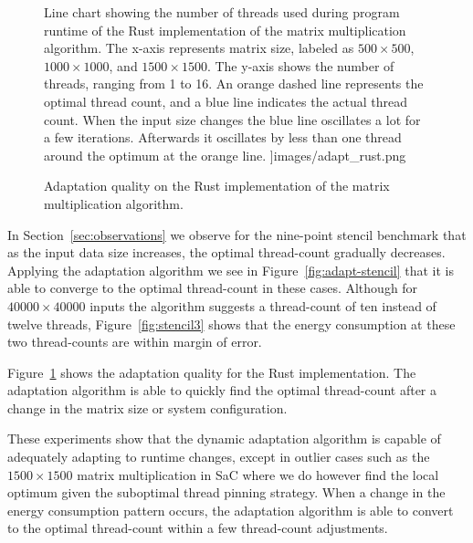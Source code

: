 \begin{figure}[t]
\begin{minipage}[c]{0.49\linewidth}
{            Line chart showing the number of threads used during program runtime of the Rust
            implementation of the matrix multiplication algorithm. The x-axis represents matrix
            size, labeled as $500 \times 500$, $1000 \times 1000$, and $1500 \times 1500$. The
            y-axis shows the number of threads, ranging from 1 to 16. An orange dashed line
            represents the optimal thread count, and a blue line indicates the actual thread count.
            When the input size changes the blue line oscillates a lot for a few iterations.
            Afterwards it oscillates by less than one thread around the optimum at the orange line.
        }]{images/adapt_rust.png}
        \caption{Adaptation quality on the Rust implementation of the matrix multiplication algorithm.}
        \label{fig:adapt-rust}
    \end{minipage}%
\end{figure}

In Section~\ref{sec:observations} we observe for the nine-point stencil benchmark that as the input
data size increases, the optimal thread-count gradually decreases. Applying the adaptation algorithm
we see in Figure~\ref{fig:adapt-stencil} that it is able to converge to the optimal thread-count in
these cases. Although for $40000 \times 40000$ inputs the algorithm suggests a thread-count of ten
instead of twelve threads, Figure~\ref{fig:stencil3} shows that the energy consumption at these two
thread-counts are within margin of error.

Figure~\ref{fig:adapt-rust} shows the adaptation quality for the Rust implementation. The adaptation
algorithm is able to quickly find the optimal thread-count after a change in the matrix size or
system configuration.

These experiments show that the dynamic adaptation algorithm is capable of adequately adapting to
runtime changes, except in outlier cases such as the $1500 \times 1500$ matrix multiplication in
SaC where we do however find the local optimum given the suboptimal thread pinning strategy. When
a change in the energy consumption pattern occurs, the adaptation algorithm is able to convert to
the optimal thread-count within a few thread-count adjustments.

